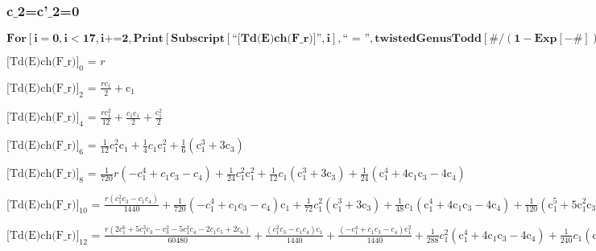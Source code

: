 \documentclass{article}
\newcommand{\unicode}[1]{{}}
\begin{document}
\subsubsection*{c$\_$2=c{'}$\_$2=0}

\begin{doublespace}
\noindent\(\pmb{\text{For}\left[i=0,i<17,i\text{+=}2, \text{Print}\left[\text{Subscript}[\text{{``}[Td(E)ch(F$\_$r)]{''}},i],\text{{``} = {''}},\text{twistedGenusTodd}[\#/(1-\text{Exp}[-\#])\&,i]
\text{/.}c_2\to 0\text{/.}\text{c$\unicode{02bc}$}_2\to 0\right]\right]}\)
\end{doublespace}

\noindent\(\text{[Td(E)ch(F$\_$r)]}_0\text{ = }r\)

\noindent\(\text{[Td(E)ch(F$\_$r)]}_2\text{ = }\frac{r c_1}{2}+\text{c$\unicode{02bc}$}_1\)

\noindent\(\text{[Td(E)ch(F$\_$r)]}_4\text{ = }\frac{r c_1^2}{12}+\frac{c_1 \text{c$\unicode{02bc}$}_1}{2}+\frac{\text{c$\unicode{02bc}$}_1^2}{2}\)

\noindent\(\text{[Td(E)ch(F$\_$r)]}_6\text{ = }\frac{1}{12} c_1^2 \text{c$\unicode{02bc}$}_1+\frac{1}{4} c_1 \text{c$\unicode{02bc}$}_1^2+\frac{1}{6}
\left(\text{c$\unicode{02bc}$}_1^3+3 \text{c$\unicode{02bc}$}_3\right)\)

\noindent\(\text{[Td(E)ch(F$\_$r)]}_8\text{ = }\frac{1}{720} r \left(-c_1^4+c_1 c_3-c_4\right)+\frac{1}{24} c_1^2 \text{c$\unicode{02bc}$}_1^2+\frac{1}{12}
c_1 \left(\text{c$\unicode{02bc}$}_1^3+3 \text{c$\unicode{02bc}$}_3\right)+\frac{1}{24} \left(\text{c$\unicode{02bc}$}_1^4+4 \text{c$\unicode{02bc}$}_1
\text{c$\unicode{02bc}$}_3-4 \text{c$\unicode{02bc}$}_4\right)\)

\noindent\(\text{[Td(E)ch(F$\_$r)]}_{10}\text{ = }\frac{r \left(c_1^2 c_3-c_1 c_4\right)}{1440}+\frac{1}{720} \left(-c_1^4+c_1 c_3-c_4\right) \text{c$\unicode{02bc}$}_1+\frac{1}{72}
c_1^2 \left(\text{c$\unicode{02bc}$}_1^3+3 \text{c$\unicode{02bc}$}_3\right)+\frac{1}{48} c_1 \left(\text{c$\unicode{02bc}$}_1^4+4 \text{c$\unicode{02bc}$}_1
\text{c$\unicode{02bc}$}_3-4 \text{c$\unicode{02bc}$}_4\right)+\frac{1}{120} \left(\text{c$\unicode{02bc}$}_1^5+5 \text{c$\unicode{02bc}$}_1^2 \text{c$\unicode{02bc}$}_3-5
\text{c$\unicode{02bc}$}_1 \text{c$\unicode{02bc}$}_4+5 \text{c$\unicode{02bc}$}_5\right)\)

\noindent\(\text{[Td(E)ch(F$\_$r)]}_{12}\text{ = }\frac{r \left(2 c_1^6+5 c_1^3 c_3-c_3^2-5 c_1^2 c_4-2 c_1 c_5+2 c_6\right)}{60480}+\frac{\left(c_1^2
c_3-c_1 c_4\right) \text{c$\unicode{02bc}$}_1}{1440}+\frac{\left(-c_1^4+c_1 c_3-c_4\right) \text{c$\unicode{02bc}$}_1^2}{1440}+\frac{1}{288} c_1^2
\left(\text{c$\unicode{02bc}$}_1^4+4 \text{c$\unicode{02bc}$}_1 \text{c$\unicode{02bc}$}_3-4 \text{c$\unicode{02bc}$}_4\right)+\frac{1}{240} c_1
\left(\text{c$\unicode{02bc}$}_1^5+5 \text{c$\unicode{02bc}$}_1^2 \text{c$\unicode{02bc}$}_3-5 \text{c$\unicode{02bc}$}_1 \text{c$\unicode{02bc}$}_4+5
\text{c$\unicode{02bc}$}_5\right)+\frac{1}{720} \left(\text{c$\unicode{02bc}$}_1^6+6 \text{c$\unicode{02bc}$}_1^3 \text{c$\unicode{02bc}$}_3+3 \text{c$\unicode{02bc}$}_3^2-6
\text{c$\unicode{02bc}$}_1^2 \text{c$\unicode{02bc}$}_4+6 \text{c$\unicode{02bc}$}_1 \text{c$\unicode{02bc}$}_5-6 \text{c$\unicode{02bc}$}_6\right)\)
\end{document}
